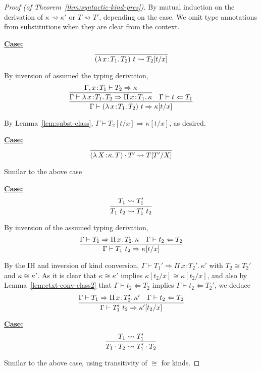 \documentclass{article}
\newcommand{\abs}[4]{{#1}\, #2\! : \! #3.\, #4}
\newcommand{\tpcheck}[0]{\Leftarrow}
\newcommand{\tpsynth}[0]{\Rightarrow}
\newcommand{\startcase}[1]{\vspace{#1} \noindent\textbf{\underline{Case:}}}
\begin{document}
\begin{proof}[Proof (of Theorem~\ref{thm:syntactic-kind-pres})]
  By mutual induction on the derivation of \(\kappa \rightsquigarrow \kappa'\)
  or \(T \rightsquigarrow T'\), depending on the case.
  We omit type annotations from substitutions when they are clear from the context.

  \startcase{.2cm}
  \[
    \infer{
      (\abs{\lambda}{x}{T_1}{T_2})\ t \rightsquigarrow T_2[t/x]
    }{}
  \]

  By inversion of assumed the typing derivation,
  \[
    \infer{
      \Gamma \vdash (\abs{\lambda}{x}{T_1}{T_2})\ t \tpsynth \kappa[t/x]
    }{
      \infer{
        \Gamma \vdash \abs{\lambda}{x}{T_1}{T_2} \tpsynth \abs{\Pi}{x}{T_1}{\kappa}
      }{
        \Gamma,x\!:\!T_1 \vdash T_2 \tpsynth \kappa
      }
      &
      \Gamma \vdash t \tpcheck T_1
    }
  \]

  By Lemma~\ref{lem:subst-class}, \(\Gamma \vdash T_2[t/x] \tpsynth
  \kappa[t/x]\), as desired.

  \startcase{.2cm}
  \[
    \infer{
      (\abs{\lambda}{X}{\kappa}T) \cdot T' \rightsquigarrow T[T'/X]
    }{}
  \]

  Similar to the above case
  
  \startcase{.2cm}
  \[
    \infer{
      T_1\ t_2 \rightsquigarrow T_1'\ t_2
    }{
      T_1 \rightsquigarrow T_1'
    }
  \]

  By inversion of the assumed typing derivation,
  \[
    \infer{
      \Gamma \vdash T_1\ t_2 \tpsynth \kappa[t/x]
    }{
      \Gamma \vdash T_1 \tpsynth \abs{\Pi}{x}{T_2}{\kappa}
      & \Gamma \vdash t_2 \tpcheck T_2
    }
  \]


  By the IH and inversion of kind conversion, \(\Gamma \vdash T_1' \tpsynth
  \abs{\Pi}{x}{T_2'}{\kappa'}\) with \(T_2 \cong T_2'\) and \(\kappa \cong
  \kappa'\).
  As it is clear that \(\kappa \cong \kappa'\) implies \(\kappa[t_2/x]
  \cong \kappa[t_2/x]\), and also by Lemma~\ref{lem:ctxt-conv-class2}   that
  \(\Gamma \vdash t_2 \tpcheck T_2\) implies \(\Gamma \vdash t_2 \tpcheck
  T_2'\), we deduce
  \[
    \infer{
      \Gamma \vdash T_1'\ t_2 \tpsynth \kappa'[t_2/x]
    }{
      \Gamma \vdash T_1 \tpsynth \abs{\Pi}{x}{T_2'}{\kappa'}
      \quad \Gamma \vdash t_2 \tpcheck T_2
    }
  \]

  \startcase{.2cm}
  \[
    \infer{
      T_1 \cdot T_2 \rightsquigarrow T_1' \cdot T_2
    }{
      T_1 \rightsquigarrow T_1'
    }
  \]

  Similar to the above case, using transitivity of \(\cong\) for kinds.


\end{proof}
\end{document}

